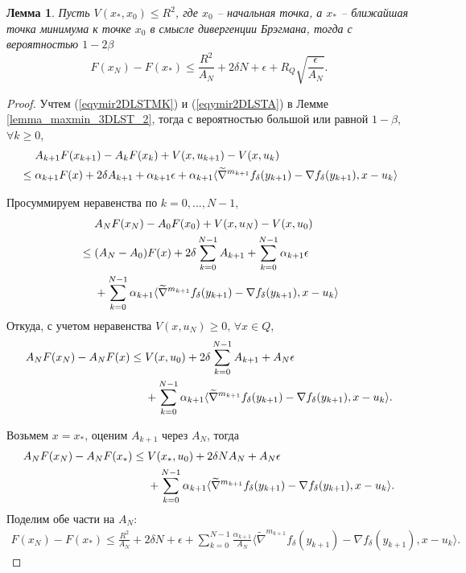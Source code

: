 \documentclass[11pt,a4]{article}
\newtheorem{lemma}{Лемма}
\begin{document}
\begin{lemma}
	\label{mainTheoremDLST}
	Пусть $V(x_*, x_0) \leq R^2$, где $x_0$ -- начальная точка, а $x_*$ -- ближайшая точка минимума к точке $x_0$ в смысле дивергенции Брэгмана, тогда с вероятностью $1 - 2\beta$
	\begin{equation*}
	F(x_N) - F(x_*)\leq \frac{R^2}{A_{N}} + 2\delta N + \epsilon + R_Q\sqrt{\frac{\epsilon}{A_N}}.
	\end{equation*}
\end{lemma}
\begin{proof}

	Учтем (\ref{eqymir2DLSTMK}) и (\ref{eqymir2DLSTA}) в Лемме \ref{lemma_maxmin_3DLST_2}, тогда с вероятностью большой или равной $1 - \beta$, $\forall k \geq 0$,
	\begin{align*}
		&\hphantom{{}={}}A_{k+1} F(x_{k+1}) - A_{k} F(x_{k}) + V(x, u_{k+1}) - V(x, u_{k}) \\&\leq \alpha_{k+1}F(x) + 2\delta A_{k+1} + \alpha_{k+1}\epsilon + \alpha_{k+1}\langle \widetilde{\nabla}^{m_{k+1}} f_\delta(y_{k+1})-\nabla f_\delta(y_{k+1}), x - u_k \rangle
	\end{align*}
	
	Просуммируем неравенства по $k = 0, ..., N - 1$, 
	\begin{align*}
	&\hphantom{{}={}}A_{N} F(x_N) - A_{0} F(x_0) + V(x, u_N) - V(x, u_0) \\&\leq (A_N - A_0)F(x) + 2\delta\sum_{k = 0}^{N-1}A_{k+1} + \sum_{k = 0}^{N-1}\alpha_{k+1}\epsilon \\&\hphantom{{}={}}+ \sum_{k = 0}^{N-1}\alpha_{k+1}\langle \widetilde{\nabla}^{m_{k+1}} f_\delta(y_{k+1})-\nabla f_\delta(y_{k+1}), x - u_k \rangle
	\end{align*}
	Откуда, с учетом неравенства $V(x, u_N)\geq 0,\,\forall x \in Q$,
	\begin{align*}
		A_{N} F(x_N) - A_NF(x) &\leq V(x, u_0) +
		 2\delta\sum_{k = 0}^{N-1}A_{k+1}+A_N\epsilon\\&\hphantom{{}={}}+ \sum_{k = 0}^{N-1}\alpha_{k+1}\langle \widetilde{\nabla}^{m_{k+1}} f_\delta(y_{k+1})-\nabla f_\delta(y_{k+1}), x - u_k \rangle.
	\end{align*}
	
	Возьмем $x = x_*$, оценим $A_{k+1}$ через $A_N$, тогда
	\begin{align*}
	A_{N} F(x_N) - A_NF(x_*)  &\leq V(x_*, u_0) +
			 2\delta N A_{N}+A_N\epsilon\\&\hphantom{{}={}}+ \sum_{k = 0}^{N-1}\alpha_{k+1}\langle \widetilde{\nabla}^{m_{k+1}} f_\delta(y_{k+1})-\nabla f_\delta(y_{k+1}), x - u_k \rangle.
	\end{align*}
	Поделим обе части на $A_{N}$:
	\begin{align}
	\label{beforeLemmause}
	F(x_N) - F(x_*)\leq \frac{R^2}{A_{N}} + 2\delta N + \epsilon + \sum_{k = 0}^{N-1}\frac{\alpha_{k+1}}{A_N}\langle \widetilde{\nabla}^{m_{k+1}} f_\delta(y_{k+1})-\nabla f_\delta(y_{k+1}), x - u_k \rangle.
	\end{align}
	

\end{proof}
\end{document}
